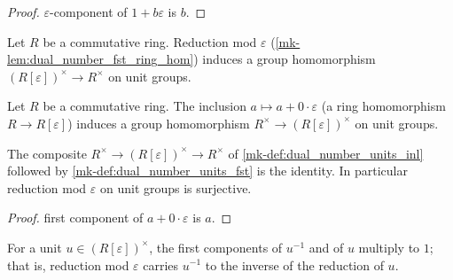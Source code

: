 \begin{proof}
  \leanokThe \(\varepsilon\)-component of \(1 + b\varepsilon\) is \(b\).
\end{proof}

\begin{definition}\label{mk-def:dual_number_units_fst}
  \leanok

  Let \(R\) be a commutative ring. Reduction mod \(\varepsilon\)
  (\ref{mk-lem:dual_number_fst_ring_hom}) induces a group homomorphism
  \((R[\varepsilon])^{\times} \to R^{\times}\) on unit groups.
\end{definition}

\begin{definition}\label{mk-def:dual_number_units_inl}
  \leanok

  Let \(R\) be a commutative ring. The inclusion
  \(a \mapsto a + 0 \cdot \varepsilon\) (a ring homomorphism
  \(R \to R[\varepsilon]\)) induces a group homomorphism
  \(R^{\times} \to (R[\varepsilon])^{\times}\) on unit groups.
\end{definition}

\begin{lemma}\label{mk-lem:dual_number_units_fst_split}
  \leanok

  The composite
  \(R^{\times} \to (R[\varepsilon])^{\times} \to R^{\times}\)
  of \ref{mk-def:dual_number_units_inl} followed by
  \ref{mk-def:dual_number_units_fst} is the identity. In particular
  reduction mod \(\varepsilon\) on unit groups is surjective.
\end{lemma}

\begin{proof}
  \leanokThe first component of \(a + 0\cdot\varepsilon\) is \(a\).
\end{proof}

\begin{lemma}\label{mk-lem:dual_number_fst_unit_inv}
  \leanok

  For a unit \(u \in (R[\varepsilon])^{\times}\), the first components
  of \(u^{-1}\) and of \(u\) multiply to \(1\); that is, reduction mod
  \(\varepsilon\) carries \(u^{-1}\) to the inverse of the reduction of
  \(u\).
\end{lemma}

